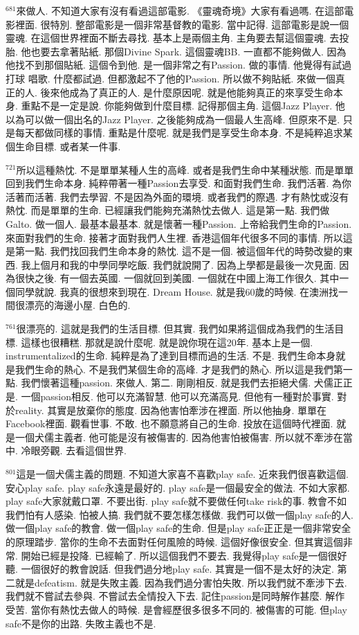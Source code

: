 \documentclass{book}
\begin{document}
$^{681}$來做人.
不知道大家有沒有看過這部電影.
《靈魂奇境》大家有看過嗎.
在這部電影裡面.
很特別.
整部電影是一個非常基督教的電影.
當中記得.
這部電影是說一個靈魂.
在這個世界裡面不斷去尋找.
基本上是兩個主角.
主角要去幫這個靈魂.
去投胎.
他也要去拿著貼紙.
那個Divine Spark.
這個靈魂BB.
一直都不能夠做人.
因為他找不到那個貼紙.
這個令到他.
是一個非常之有Passion.
做的事情.
他覺得有試過打球 唱歌.
什麼都試過.
但都激起不了他的Passion.
所以做不夠貼紙.
來做一個真正的人.
後來他成為了真正的人.
是什麼原因呢.
就是他能夠真正的來享受生命本身.
重點不是一定是說.
你能夠做到什麼目標.
記得那個主角.
這個Jazz Player.
他以為可以做一個出名的Jazz Player.
之後能夠成為一個最人生高峰.
但原來不是.
只是每天都做同樣的事情.
重點是什麼呢.
就是我們是享受生命本身.
不是純粹追求某個生命目標.
或者某一件事.

$^{721}$所以這種熱忱.
不是單單某種人生的高峰.
或者是我們生命中某種狀態.
而是單單回到我們生命本身.
純粹帶著一種Passion去享受.
和面對我們生命.
我們活著.
為你活著而活著.
我們去學習.
不是因為外面的環境.
或者我們的際遇.
才有熱忱或沒有熱忱.
而是單單的生命.
已經讓我們能夠充滿熱忱去做人.
這是第一點.
我們做Galto.
做一個人.
最基本最基本.
就是懷著一種Passion.
上帝給我們生命的Passion.
來面對我們的生命.
接著才面對我們人生裡.
香港這個年代很多不同的事情.
所以這是第一點.
我們找回我們生命本身的熱忱.
這不是一個.
被這個年代的時勢改變的東西.
我上個月和我的中學同學吃飯.
我們就說開了.
因為上學都是最後一次見面.
因為很快之後.
有一個去英國.
一個就回到美國.
一個就在中國上海工作很久.
其中一個同學就說.
我真的很想來到現在.
Dream House.
就是我60歲的時候.
在澳洲找一間很漂亮的海邊小屋.
白色的.

$^{761}$很漂亮的.
這就是我們的生活目標.
但其實.
我們如果將這個成為我們的生活目標.
這樣也很糟糕.
那就是說什麼呢.
就是說你現在這20年.
基本上是一個.
instrumentalized的生命.
純粹是為了達到目標而過的生活.
不是.
我們生命本身就是我們生命的熱心.
不是我們某個生命的高峰.
才是我們的熱心.
所以這是我們第一點.
我們懷著這種passion.
來做人.
第二.
剛剛相反.
就是我們去拒絕犬儒.
犬儒正正是.
一個passion相反.
他可以充滿智慧.
他可以充滿高見.
但他有一種對於事實.
對於reality.
其實是放棄你的態度.
因為他害怕牽涉在裡面.
所以他抽身.
單單在Facebook裡面.
觀看世事.
不敢.
也不願意將自己的生命.
投放在這個時代裡面.
就是一個犬儒主義者.
他可能是沒有被傷害的.
因為他害怕被傷害.
所以就不牽涉在當中.
冷眼旁觀.
去看這個世界.

$^{801}$這是一個犬儒主義的問題.
不知道大家喜不喜歡play safe.
近來我們很喜歡這個.
安心play safe.
play safe永遠是最好的.
play safe是一個最安全的做法.
不如大家都.
play safe大家就戴口罩.
不要出街.
play safe就不要做任何take risk的事.
教會不如我們怕有人感染.
怕被人搞.
我們就不要怎樣怎樣做.
我們可以做一個play safe的人.
做一個play safe的教會.
做一個play safe的生命.
但是play safe正正是一個非常安全的原理踏步.
當你的生命不去面對任何風險的時候.
這個好像很安全.
但其實這個非常.
開始已經是投降.
已經輸了.
所以這個我們不要去.
我覺得play safe是一個很好聽.
一個很好的教會說話.
但我們過分地play safe.
其實是一個不是太好的決定.
第二就是defeatism.
就是失敗主義.
因為我們過分害怕失敗.
所以我們就不牽涉下去.
我們就不嘗試去參與.
不嘗試去全情投入下去.
記住passion是同時解作甚麼.
解作受苦.
當你有熱忱去做人的時候.
是會經歷很多很多不同的.
被傷害的可能.
但play safe不是你的出路.
失敗主義也不是.
\end{document}

